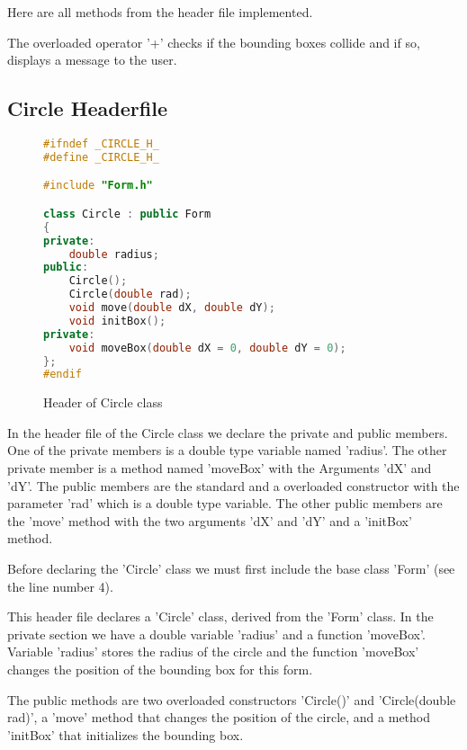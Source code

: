 \documentclass[a4paper, 10pt]{article}
\begin{document}
Here are all methods from the header file implemented.

The overloaded operator '+' checks if the bounding boxes collide and if so, displays a message to the user.

\subsection{Circle Headerfile}
\begin{figure}[H]
\begin{lstlisting}[language=c++]
#ifndef _CIRCLE_H_
#define _CIRCLE_H_

#include "Form.h"

class Circle : public Form
{
private:
	double radius;
public:
	Circle();
	Circle(double rad);
	void move(double dX, double dY);
	void initBox();
private:
	void moveBox(double dX = 0, double dY = 0);
};
#endif
\end{lstlisting}
\caption{Header of Circle class}
\end{figure}
In the header file of the Circle class we declare the private and public members. One of the private members is a double type variable named 'radius'. The other private member is a method named 'moveBox' with the Arguments 'dX' and 'dY'. The public members are the standard and a overloaded constructor with the parameter 'rad' which is a double type variable. The other public members are the 'move' method with the two arguments 'dX' and 'dY' and a 'initBox' method.

Before declaring the 'Circle' class we must first include the base class 'Form' (see the line number 4).

This header file declares a 'Circle' class, derived from the 'Form' class.
In the private section we have a double variable 'radius' and a function 'moveBox'. Variable 'radius' stores the radius of the circle and the function 'moveBox' changes the position of the bounding box for this form.

The public methods are two overloaded constructors 'Circle()' and 'Circle(double rad)', a 'move' method that changes the position of the circle, and a method 'initBox' that initializes the bounding box.
\end{document}
